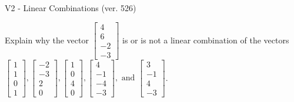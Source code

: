 \begin{exercise}
  \begin{exerciseTitle}V2 - Linear Combinations (ver. 526)\end{exerciseTitle}
  \begin{exerciseStatement}
    Explain why the vector \(\left[\begin{array}{c}
4 \\
6 \\
-2 \\
-3
\end{array}\right]\)  is or is not a linear 
	combination of the vectors \(\left[\begin{array}{c}
1 \\
1 \\
0 \\
1
\end{array}\right] , \left[\begin{array}{c}
-2 \\
-3 \\
2 \\
0
\end{array}\right] , \left[\begin{array}{c}
1 \\
0 \\
4 \\
0
\end{array}\right] , \left[\begin{array}{c}
4 \\
-1 \\
-4 \\
-3
\end{array}\right] , \text{ and } \left[\begin{array}{c}
3 \\
-1 \\
4 \\
-3
\end{array}\right]\).
	



\end{exerciseStatement}
\end{exercise}

